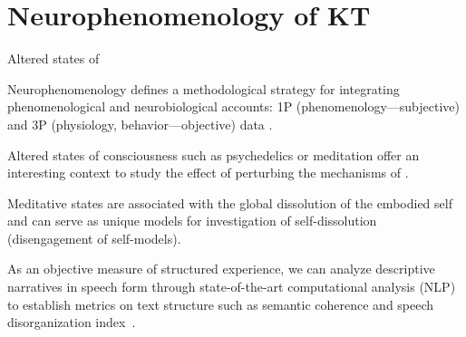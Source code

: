 \section{Neurophenomenology of KT}




\begin{frame}[label=ladila]{Altered states of \SEP}
  
 Neurophenomenology defines a methodological strategy for integrating phenomenological and neurobiological accounts: 1P  (phenomenology---subjective) and 3P (physiology, behavior---objective) data \citep{Varela:1996aa}. \vfill
 
 Altered states of consciousness such as psychedelics or meditation offer an interesting context to study the effect of perturbing the mechanisms of \SEP.\vfill
 
Meditative states are associated with the global dissolution of the embodied self  \citep{Millire2018} and can  serve as unique models for  investigation of self-dissolution (disengagement of self-models).\vfill
 
 As an  objective measure of structured experience, we can analyze descriptive narratives in speech form through state-of-the-art computational analysis (NLP) to establish  metrics on text structure such as semantic coherence and speech disorganization index~\citep{Sanz:2021, Tagliazucchi:2022, Mota:2017}.
 
 
\end{frame}

